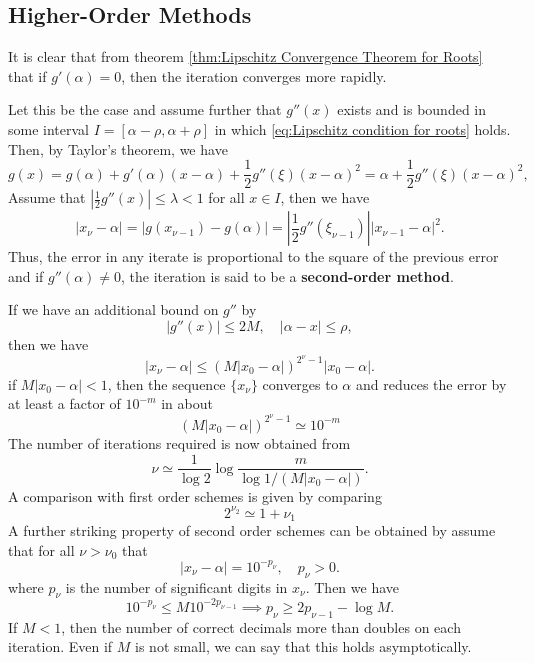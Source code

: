 \documentclass[../main.tex]{subfiles}
\begin{document}
\subsection{Higher-Order Methods}
It is clear that from theorem \ref{thm:Lipschitz Convergence Theorem for Roots} that if $g'(\alpha) = 0$, then the iteration converges more rapidly.

Let this be the case and assume further that $g''(x)$ exists and is bounded in some interval $I = [\alpha - \rho, \alpha + \rho]$ in which \eqref{eq:Lipschitz condition for roots} holds. Then, by Taylor's theorem, we have
\begin{equation}
	g(x) = g(\alpha) + g'(\alpha)(x - \alpha) + \frac{1}{2} g''(\xi) (x - \alpha)^2 = \alpha + \frac{1}{2} g''(\xi) (x - \alpha)^2,
\end{equation}
Assume that $|\frac{1}{2} g''(x)| \leq \lambda < 1$ for all $x \in I$, then we have
\begin{equation*}
	|x_{\nu} - \alpha| = | g(x_{\nu-1}) - g(\alpha)| = \left| \frac{1}{2} g''(\xi_{\nu-1}) \right| |x_{\nu-1} - \alpha|^2.
\end{equation*}
Thus, the error in any iterate is proportional to the square of the previous error and if $g''(\alpha) \neq 0$, the iteration is said to be a \textbf{second-order method}.

If we have an additional bound on $g''$ by
\begin{equation}
	| g''(x) | \leq 2M, \quad |\alpha - x| \leq \rho,
\end{equation}
then we have
\begin{equation}
	|x_{\nu} - \alpha| \leq (M | x_0 - \alpha |)^{2^\nu - 1} |x_0 - \alpha|.
\end{equation}
if $M | x_0 - \alpha | < 1$, then the sequence $\{x_\nu\}$ converges to $\alpha$ and reduces the error by at least a factor of $10^{-m}$ in about
\begin{equation*}
	(M | x_0 - \alpha |)^{2^\nu - 1} \simeq 10^{-m}
\end{equation*}
The number of iterations required is now obtained from
\begin{equation}
	\nu \simeq \frac{1}{\log 2} \log \frac{m}{\log 1 / (M | x_0 - \alpha |)}.
\end{equation}
A comparison with first order schemes is given by comparing
\begin{equation*}
	2^{\nu_2} \simeq 1 + \nu_1
\end{equation*}
A further striking property of second order schemes can be obtained by assume that for all $\nu > \nu_0$ that
\begin{equation*}
	|x_{\nu} - \alpha| = 10^{-p_{\nu}}, \quad p_{\nu} > 0.
\end{equation*}
where $p_\nu$ is the number of significant digits in $x_\nu$. Then we have
\begin{equation*}
	10^{-p_{\nu}} \leq M 10^{-2 p_{\nu-1}} \implies p_\nu \geq 2 p_{\nu-1} - \log M.
\end{equation*}
If $M < 1$, then the number of correct decimals more than doubles on each iteration. Even if $M$ is not small, we can say that this holds asymptotically.
\end{document}
